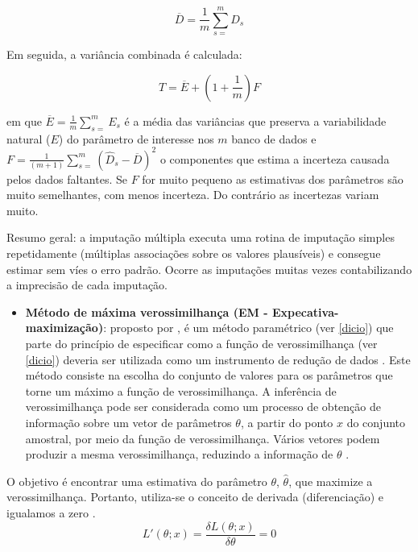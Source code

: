 \documentclass[
]{book}
\providecommand{\tightlist}{%
  \setlength{\itemsep}{0pt}\setlength{\parskip}{0pt}}
\begin{document}
\begin{equation}
  \overline{D}=\frac{1}{m}\displaystyle \sum^{m}_{s=}\hat{D}_s
  \label{eq:mediaimputmul}
\end{equation}

Em seguida, a variância combinada é calculada:

\begin{equation}
T  =\overline{E}+ (1+\frac{1}{m})F
  \label{eq:varimputmul}
\end{equation}

em que \(\overline{E}= \frac{1}{m}\displaystyle \sum^{m}_{s=} E_s\) é a média das variâncias que preserva a variabilidade natural (\(E\)) do parâmetro de interesse nos \(m\) banco de dados e \(F=\frac{1}{(m+1)}\displaystyle \sum^{m}_{s=}(\hat{D}_s-\overline{D})^2\) o componentes que estima a incerteza causada pelos dados faltantes. Se \(F\) for muito pequeno as estimativas dos parâmetros são muito semelhantes, com menos incerteza. Do contrário as incertezas variam muito.

Resumo geral: a imputação múltipla executa uma rotina de imputação simples repetidamente (múltiplas associações sobre os valores plausíveis) e consegue estimar sem víes o erro padrão. Ocorre as imputações muitas vezes contabilizando a imprecisão de cada imputação.

\begin{itemize}
\tightlist
\item
  \textbf{Método de máxima verossimilhança (EM - Expecativa-maximização)}: proposto por \citet{fisher1912absolute} , é um método paramétrico (ver \ref{dicio}) que parte do princípio de especificar como a função de verossimilhança (ver \ref{dicio}) deveria ser utilizada como um instrumento de redução de dados \citet{casella2010inferencia}. Este método consiste na escolha do conjunto de valores para os parâmetros que torne um máximo a função de verossimilhança. A inferência de verossimilhança pode ser considerada como um processo de obtenção de informação sobre um vetor de parâmetros \(\theta\), a partir do ponto \(x\) do conjunto amostral, por meio da função de verossimilhança. Vários vetores podem produzir a mesma verossimilhança, reduzindo a informação de \(\theta\) \citep{cordeiro1999introduccao}.
\end{itemize}

O objetivo é encontrar uma estimativa do parâmetro \(\theta\), \(\hat{\theta}\), que maximize a verossimilhança. Portanto, utiliza-se o conceito de derivada (diferenciação) e igualamos a zero \citep{bolfarine2001introduccao}.
\begin{equation}
  L'(\theta;x)=\frac{\delta L(\theta;x)}{\delta \theta}=0
\label{eq:derivadaverossimilhanca}
\end{equation}
\end{document}
